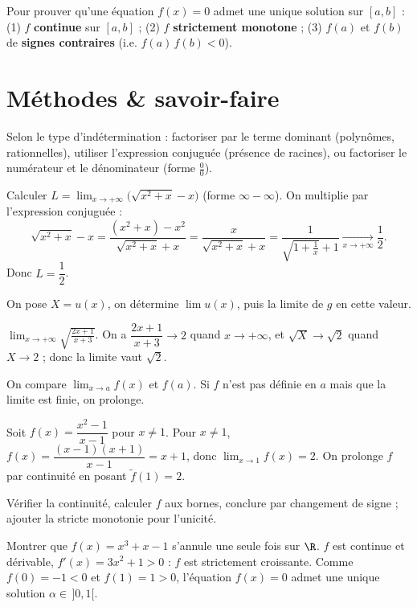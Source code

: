 \begin{aretenir}
Pour prouver qu'une équation $f(x)=0$ admet une unique solution sur $[a,b]$ : (1) $f$ \textbf{continue} sur $[a,b]$ ; (2) $f$ \textbf{strictement monotone} ; (3) $f(a)$ et $f(b)$ de \textbf{signes contraires} (i.e. $f(a)\,f(b)<0$).
\end{aretenir}

\section{Méthodes \& savoir-faire}

Selon le type d'indétermination : factoriser par le terme dominant (polynômes, rationnelles), utiliser l'expression conjuguée (présence de racines), ou factoriser le numérateur et le dénominateur (forme $\frac00$).
\begin{exemple}
Calculer $\displaystyle L=\lim_{x\to+\infty}\big(\sqrt{x^{2}+x}-x\big)$ (forme $\infty-\infty$). On multiplie par l'expression conjuguée :
\[
\sqrt{x^{2}+x}-x=\frac{(x^{2}+x)-x^{2}}{\sqrt{x^{2}+x}+x}=\frac{x}{\sqrt{x^{2}+x}+x}
=\frac{1}{\sqrt{1+\frac1x}+1}\xrightarrow[x\to+\infty]{}\frac12 .
\]
Donc $L=\dfrac12$.
\end{exemple}

On pose $X=u(x)$, on détermine $\lim u(x)$, puis la limite de $g$ en cette valeur.
\begin{exemple}
$\displaystyle\lim_{x\to+\infty}\sqrt{\frac{2x+1}{x+3}}$. On a $\dfrac{2x+1}{x+3}\to 2$ quand $x\to+\infty$, et $\sqrt{X}\to\sqrt2$ quand $X\to2$ ; donc la limite vaut $\sqrt2$.
\end{exemple}

On compare $\displaystyle\lim_{x\to a}f(x)$ et $f(a)$. Si $f$ n'est pas définie en $a$ mais que la limite est finie, on prolonge.
\begin{exemple}
Soit $f(x)=\dfrac{x^{2}-1}{x-1}$ pour $x\neq1$. Pour $x\neq1$, $f(x)=\dfrac{(x-1)(x+1)}{x-1}=x+1$, donc $\displaystyle\lim_{x\to1}f(x)=2$. On prolonge $f$ par continuité en posant $\tilde f(1)=2$.
\end{exemple}

Vérifier la continuité, calculer $f$ aux bornes, conclure par changement de signe ; ajouter la stricte monotonie pour l'unicité.
\begin{exemple}
Montrer que $f(x)=x^{3}+x-1$ s'annule une seule fois sur $\R$. $f$ est continue et dérivable, $f'(x)=3x^{2}+1>0$ : $f$ est strictement croissante. Comme $f(0)=-1<0$ et $f(1)=1>0$, l'équation $f(x)=0$ admet une unique solution $\alpha\in\,]0,1[$.
\end{exemple}

